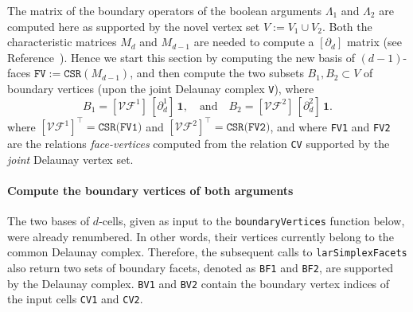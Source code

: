 \documentclass[11pt,oneside]{article}	%
\begin{document}
The matrix of the boundary operators of the boolean arguments $\Lambda_1$ and $\Lambda_2$ are computed here as supported by the novel vertex set $V := V_1 \cup V_2$. Both the characteristic matrices $M_d$ and $M_{d-1}$ are needed to compute a $[\partial_d]$ matrix (see Reference~\cite{Dicarlo:2014:TNL:2543138.2543294}). Hence we start this section by computing the new basis of $(d-1)$-faces $\texttt{FV} := \texttt{CSR}(M_{d-1})$, and then compute the two subsets $B_1,B_2 \subset V$ of boundary vertices (upon the joint Delaunay complex \texttt{V}), where
\[
B_1 = [\mathcal{VF}^1]\, [\partial_d^1]\,\mathbf{1},
\quad\mbox{and}\quad
B_2 = [\mathcal{VF}^2]\, [\partial_d^2]\,\mathbf{1}.
\]
where $[\mathcal{VF}^1]^\top = \texttt{CSR(FV1)}$ and $[\mathcal{VF}^2]^\top = \texttt{CSR(FV2)}$,
and where \texttt{FV1} and \texttt{FV2} are the relations \emph{face-vertices} computed from the relation \texttt{CV} supported by the \emph{joint} Delaunay vertex set. 

\paragraph{Compute the boundary vertices of both arguments}
The two bases of $d$-cells, given as input to the \texttt{boundaryVertices} function below, were already renumbered. In other words, their vertices currently belong to the common Delaunay complex. Therefore, the subsequent calls to \texttt{larSimplexFacets} also return two sets of boundary facets, denoted as \texttt{BF1} and \texttt{BF2}, are supported by the Delaunay complex. \texttt{BV1} and \texttt{BV2} contain the boundary vertex indices of the input cells \texttt{CV1} and \texttt{CV2}.
\end{document}
